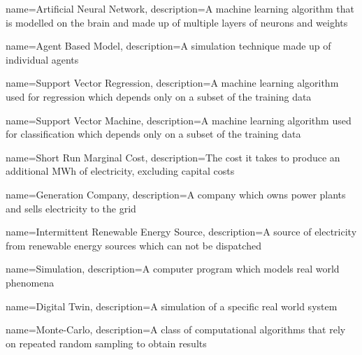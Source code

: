 {
        name=Artificial Neural Network,
        description={A machine learning algorithm that is modelled on the brain and made up of multiple layers of neurons and weights}
}



{
        name=Agent Based Model,
        description={A simulation technique made up of individual agents}
}




{
        name=Support Vector Regression,
        description={A machine learning algorithm used for regression which depends only on a subset of the training data}
}




{
	name=Support Vector Machine,
	description={A machine learning algorithm used for classification which depends only on a subset of the training data}
}






{
	name=Short Run Marginal Cost,
	description={The cost it takes to produce an additional MWh of electricity, excluding capital costs}
}



{
	name=Generation Company,
	description={A company which owns power plants and sells electricity to the grid}
}




{
	name=Intermittent Renewable Energy Source,
	description={A source of electricity from renewable energy sources which can not be dispatched}
}





{
	name=Simulation,
	description={A computer program which models real world phenomena}
}



{
	name=Digital Twin,
	description={A simulation of a specific real world system}
}


{
	name=Monte-Carlo,
	description={A class of computational algorithms that rely on repeated random sampling to obtain results}
}



